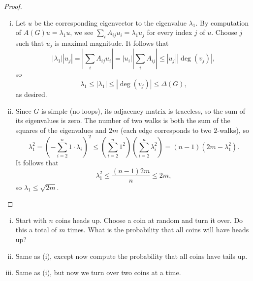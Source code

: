 \documentclass[11pt]{scrartcl}
\begin{document}
\begin{proof}
    \begin{enumerate}[(i)]
        \item Let $u$ be the corresponding eigenvector to the eigenvalue $\lambda_1$. By computation of $A(G)u = \lambda_1 u$, we see $\sum_{i} {A_{ij}u_i} = \lambda_1 u_j$ for every index $j$ of $u$. Choose $j$ such that $u_j$ is maximal magnitude. It follows that
            \[|\lambda_1| |u_j| = \left|\sum_{i} {A_{ij}u_i}\right|=|u_i|\left|\sum_i A_{ij}\right|\leq |u_j||\deg(v_j)|,\] 
            so 
           \[\lambda_1\leq|\lambda_1| \leq|\deg(v_j)|\leq\Delta(G),\]
        as desired.
        \item Since $G$ is simple (no loops), its adjacency matrix is traceless, so the sum of its eigenvalues is zero. The number of two walks is both the sum of the squares of the eigenvalues and $2m$ (each edge corresponds to two $2$-walks), so \[\lambda_1^2=\left(-\sum_{i=2}^n1\cdot\lambda_i\right)^2\leq \left(\sum_{i=2}^n1^2\right)\left(\sum_{i=2}^n\lambda_i^2\right)=(n-1)(2m-\lambda_1^2).\] It follows that \[\lambda_1^2\leq \frac{(n-1)2m}{n}\leq 2m,\] so $\lambda_1\leq \sqrt{2m}$.
    \end{enumerate}
\end{proof}
\begin{problem}
\phantom{0}
\begin{enumerate}[(i)]
    \item Start with $n$ coins heads up. Choose a coin at random and turn it over. Do this a total of $m$ times. What is the probability that all coins will have heads up?
    \item Same as (i), except now compute the probability that all coins have tails up.
    \item Same as (i), but now we turn over two coins at a time.
\end{enumerate}
\end{problem}
\end{document}
